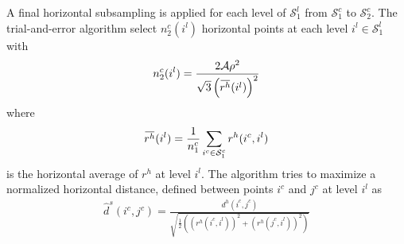 \documentclass[12pt]{scrartcl}
\newcommand{\overbar}[1]{\mkern 1.5mu\overline{\mkern-1.5mu#1\mkern-1.5mu}\mkern 1.5mu}
\begin{document}
A final horizontal subsampling is applied for each level of $\mathcal{S}^l_1$ from $\mathcal{S}^c_1$ to $\mathcal{S}^c_2$. The trial-and-error algorithm select $n^c_2(i^l)$ horizontal points at each level $i^l \in \mathcal{S}^l_1$ with
\begin{align}
n^c_2(i^l) = \frac{2 \mathcal{A} \rho^2}{\sqrt{3} \left(\overbar{r^h}(i^l)\right)^2}
\end{align}
where
\begin{align}
\overbar{r^h}(i^l) = \frac{1}{n^c_1} \sum_{i^c \in \mathcal{S}^c_1} r^h(i^c,i^l)
\end{align}
is the horizontal average of $r^h$ at level $i^l$. The algorithm tries to maximize a normalized horizontal distance, defined between points $i^c$ and $j^c$ at level $i^l$ as
\begin{align}
\widehat{d}^s(i^c,j^c) = \frac{d^h(i^c,j^c)}{\displaystyle \sqrt{\frac{1}{2}\left(\left(r^h(i^c,i^l)\right)^2+\left(r^h(j^c,i^l)\right)^2\right)}}
\end{align}
\end{document}
